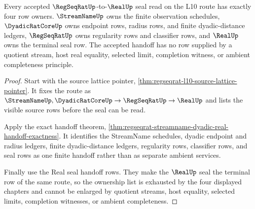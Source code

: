 \begin{theorem}
\label{thm:regseqrat-l10-source-lattice-exhaustion}
Every accepted $\RegSeqRatUp$-to-$\RealUp$ seal read on the L10 route has exactly four row owners. $\StreamNameUp$ owns the finite observation schedules, $\DyadicRatCoreUp$ owns endpoint rows, radius rows, and finite dyadic-distance ledgers, $\RegSeqRatUp$ owns regularity rows and classifier rows, and $\RealUp$ owns the terminal seal row. The accepted handoff has no row supplied by a quotient stream, host real equality, selected limit, completion witness, or ambient completeness principle.
\end{theorem}
\begin{proof}
Start with the source lattice pointer, \autoref{thm:regseqrat-l10-source-lattice-pointer}. It fixes the route as $\StreamNameUp,\DyadicRatCoreUp \to \RegSeqRatUp \to \RealUp$ and lists the visible source rows before the seal can be read.

Apply the exact handoff theorem, \autoref{thm:regseqrat-streamname-dyadic-real-handoff-exactness}. It identifies the StreamName schedules, dyadic endpoint and radius ledgers, finite dyadic-distance ledgers, regularity rows, classifier rows, and seal rows as one finite handoff rather than as separate ambient services.

Finally use the Real seal handoff rows. They make the $\RealUp$ seal the terminal row of the same route, so the ownership list is exhausted by the four displayed chapters and cannot be enlarged by quotient streams, host equality, selected limits, completion witnesses, or ambient completeness.
\end{proof}

